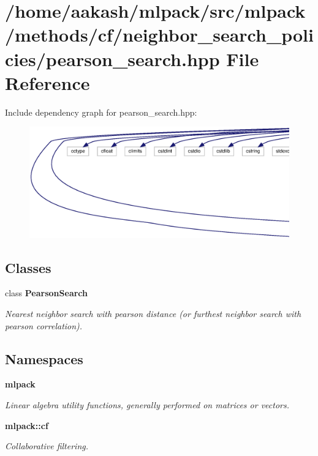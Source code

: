 \section{/home/aakash/mlpack/src/mlpack/methods/cf/neighbor\+\_\+search\+\_\+policies/pearson\+\_\+search.hpp File Reference}
\label{pearson__search_8hpp}
Include dependency graph for pearson\+\_\+search.\+hpp\+:
\nopagebreak
\begin{figure}[H]
\begin{center}
\leavevmode
\includegraphics[width=350pt]{pearson__search_8hpp__incl}
\end{center}
\end{figure}
\subsection*{Classes}
\begin{DoxyCompactItemize}
\item 
class \textbf{ Pearson\+Search}
\begin{DoxyCompactList}\small\item\em Nearest neighbor search with pearson distance (or furthest neighbor search with pearson correlation). \end{DoxyCompactList}\end{DoxyCompactItemize}
\subsection*{Namespaces}
\begin{DoxyCompactItemize}
\item 
 \textbf{ mlpack}
\begin{DoxyCompactList}\small\item\em Linear algebra utility functions, generally performed on matrices or vectors. \end{DoxyCompactList}\item 
 \textbf{ mlpack\+::cf}
\begin{DoxyCompactList}\small\item\em Collaborative filtering. \end{DoxyCompactList}\end{DoxyCompactItemize}


